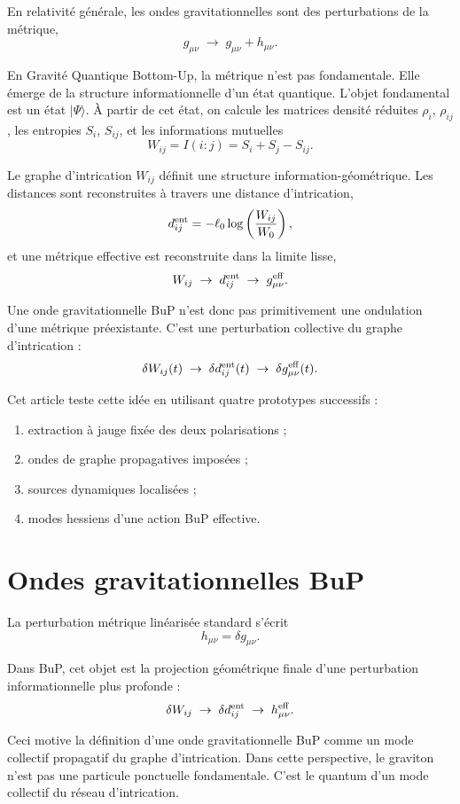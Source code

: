 \documentclass[11pt,a4paper]{article}
\begin{document}
En relativité générale, les ondes gravitationnelles sont des perturbations de la
métrique,
\[
g_{\mu\nu} \;\rightarrow\; g_{\mu\nu} + h_{\mu\nu}.
\]

En Gravité Quantique Bottom-Up, la métrique n'est pas fondamentale. Elle émerge
de la structure informationnelle d'un état quantique. L'objet fondamental est un
état \(|\Psi\rangle\). À partir de cet état, on calcule les matrices densité
réduites \(\rho_i\), \(\rho_{ij}\), les entropies \(S_i\), \(S_{ij}\), et les
informations mutuelles
\[
W_{ij} = I(i:j) = S_i + S_j - S_{ij}.
\]

Le graphe d'intrication \(W_{ij}\) définit une structure information-géométrique.
Les distances sont reconstruites à travers une distance d'intrication,
\[
d_{ij}^{\rm ent} = -\ell_0 \log\left(\frac{W_{ij}}{W_0}\right),
\]
et une métrique effective est reconstruite dans la limite lisse,
\[
W_{ij}
\;\rightarrow\;
d_{ij}^{\rm ent}
\;\rightarrow\;
g_{\mu\nu}^{\rm eff}.
\]

Une onde gravitationnelle BuP n'est donc pas primitivement une ondulation d'une
métrique préexistante. C'est une perturbation collective du graphe d'intrication :
\[
\delta W_{ij}(t)
\;\rightarrow\;
\delta d_{ij}^{\rm ent}(t)
\;\rightarrow\;
\delta g_{\mu\nu}^{\rm eff}(t).
\]

Cet article teste cette idée en utilisant quatre prototypes successifs :
\begin{enumerate}
    \item extraction à jauge fixée des deux polarisations ;
    \item ondes de graphe propagatives imposées ;
    \item sources dynamiques localisées ;
    \item modes hessiens d'une action BuP effective.
\end{enumerate}

\section{Ondes gravitationnelles BuP}

La perturbation métrique linéarisée standard s'écrit
\[
h_{\mu\nu} = \delta g_{\mu\nu}.
\]

Dans BuP, cet objet est la projection géométrique finale d'une perturbation
informationnelle plus profonde :
\[
\delta W_{ij}
\;\rightarrow\;
\delta d_{ij}^{\rm ent}
\;\rightarrow\;
h_{\mu\nu}^{\rm eff}.
\]

Ceci motive la définition d'une onde gravitationnelle BuP comme un mode collectif
propagatif du graphe d'intrication. Dans cette perspective, le graviton n'est pas
une particule ponctuelle fondamentale. C'est le quantum d'un mode collectif du
réseau d'intrication.
\end{document}
